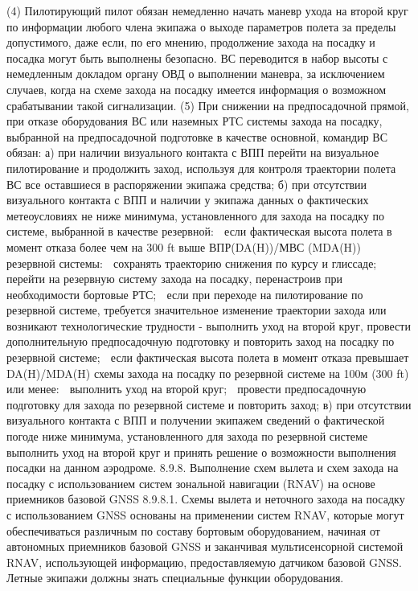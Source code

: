 (4) Пилотирующий пилот обязан немедленно начать маневр ухода на второй круг по информации любого члена экипажа о выходе параметров полета за пределы допустимого, даже если, по его мнению, продолжение захода на посадку и посадка могут быть выполнены безопасно. ВС переводится в набор высоты с немедленным докладом органу ОВД о выполнении маневра, за исключением случаев, когда на схеме захода на посадку имеется информация о возможном срабатывании такой сигнализации.
(5) При снижении на предпосадочной прямой, при отказе оборудования ВС или наземных РТС системы захода на посадку, выбранной на предпосадочной подготовке в качестве основной, командир ВС обязан:
а)	при наличии визуального контакта с ВПП перейти на визуальное пилотирование и продолжить заход, используя для контроля траектории полета ВС все оставшиеся в распоряжении экипажа средства;
б)	при отсутствии визуального контакта с ВПП и наличии у экипажа данных о фактических метеоусловиях не ниже минимума, установленного для захода на посадку по системе, выбранной в качестве резервной:
	если фактическая высота полета в момент отказа более чем на 300 ft выше ВПР(DA(H))/МВС (MDA(H)) резервной системы:
	сохранять траекторию снижения по курсу и глиссаде;
	перейти на резервную систему захода на посадку, перенастроив при необходимости бортовые РТС;
	если при переходе на пилотирование по резервной системе, требуется значительное изменение траектории захода или возникают технологические трудности - выполнить уход на второй круг, провести дополнительную предпосадочную подготовку и повторить заход на посадку по резервной системе;
	если фактическая высота полета в момент отказа превышает DA(H)/MDA(H) схемы захода на посадку по резервной системе на 100м (300 ft) или менее:
	выполнить уход на второй круг;
	провести предпосадочную подготовку для захода по резервной системе и повторить заход;
в)	при отсутствии визуального контакта с ВПП и получении экипажем сведений о фактической погоде ниже минимума, установленного для захода по резервной системе выполнить уход на второй круг и принять решение о возможности выполнения посадки на данном аэродроме.
8.9.8.	Выполнение схем вылета и схем захода на посадку с использованием систем зональной навигации (RNAV) на основе приемников базовой GNSS
8.9.8.1. Схемы вылета и неточного захода на посадку с использованием GNSS основаны на применении систем RNAV, которые могут обеспечиваться различным по составу бортовым оборудованием, начиная от автономных приемников базовой GNSS и заканчивая мультисенсорной системой RNAV, использующей информацию, предоставляемую датчиком базовой GNSS. Летные экипажи должны знать специальные функции оборудования.

